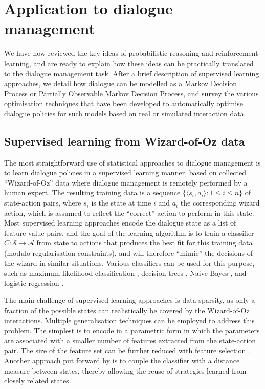 \section{Application to dialogue management}

We have now reviewed the key ideas of probabilistic reasoning and reinforcement learning, and are ready to explain how these ideas can be practically translated to the dialogue management task.  After a brief description of supervised learning approaches, we detail how dialogue can be modelled as a Markov Decision Process or Partially Observable Markov Decision Process, and survey the various optimisation techniques that have been developed to automatically optimise dialogue policies for such models based on real or simulated interaction data.  

\subsection{Supervised learning from Wizard-of-Oz data}

The most straightforward use of statistical approaches to dialogue management is to learn dialogue policies in a supervised learning manner, based on collected  ``Wizard-of-Oz'' data where dialogue management is remotely performed by a human expert.  The resulting training data is a sequence $\{\langle s_i, a_i \rangle : 1 \leq i \leq n\}$ of state-action pairs, where $s_i$ is the state at time $i$ and $a_i$ the corresponding wizard action, which is assumed to reflect the ``correct'' action to perform in this state.  Most supervised learning approaches encode the dialogue state as a list of feature-value pairs, and the goal of the learning algorithm is to train a classifier $C: \mathcal{S} \rightarrow \mathcal{A}$  from state to actions that produces the best fit for this training data (modulo regularisation constraints), and will therefore ``mimic'' the decisions of the wizard in similar situations. Various classifiers can be used for this purpose, such as maximum likelihood classification \citep{Hurtado:2005}, decision trees \citep{LaneKU04}, Naive Bayes \citep{williams2003}, and logistic regression \citep{rieser2006,Passonneau2012}.  

The main challenge of supervised learning approaches is data sparsity, as only a fraction of the possible states can realistically be covered by the Wizard-of-Oz interactions.  Multiple generalisation techniques can be employed to address this problem.  The simplest is to encode in a parametric form in which the parameters are associated with a smaller number of features extracted from the state-action pair. The size of the feature set can be further reduced with feature selection \citep{Passonneau2012}. Another approach put forward by \cite{Hurtado:2005} is to couple the classifier with a distance measure between states, thereby allowing the reuse of strategies learned from closely related states.

